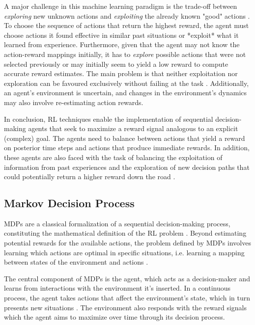A major challenge in this machine learning paradigm is the trade-off between \textit{exploring} new unknown actions and \textit{exploiting} the already known "good" actions \cite{suttonReinforcementLearningIntroduction2014}. To choose the sequence of actions that return the highest reward, the agent must choose actions it found effective in similar past situations or *exploit* what it learned from experience. Furthermore, given that the agent may not know the action-reward mappings initially, it has to \textit{explore} possible actions that were not selected previously or may initially seem to yield a low reward to compute accurate reward estimates. The main problem is that neither exploitation nor exploration can be favoured exclusively without failing at the task \cite{suttonReinforcementLearningIntroduction2014}. Additionally, an agent's environment is uncertain, and changes in the environment's dynamics may also involve re-estimating action rewards. \par


In conclusion, \ac{RL} techniques enable the implementation of sequential decision-making agents that seek to maximize a reward signal analogous to an explicit (complex) goal. The agents need to balance between actions that yield a reward on posterior time steps and actions that produce immediate rewards. In addition, these agents are also faced with the task of balancing the exploitation of information from past experiences and the exploration of new decision paths that could potentially return a higher reward down the road \cite{suttonReinforcementLearningIntroduction2014}.  \par



\subsection{Markov Decision Process} \label{section:mpd}
\acfp{MDP} are a classical formalization of a sequential decision-making process, constituting the mathematical definition of the \ac{RL} problem \cite{suttonReinforcementLearningIntroduction2014, moralesGrokkingDeepReinforcement2020}. Beyond estimating potential rewards for the available actions, the problem defined by \acp{MDP} involves learning which actions are optimal in specific situations, i.e. learning a mapping between states of the environment and actions \cite{suttonReinforcementLearningIntroduction2014}. 

The central component of \acp{MDP} is the agent, which acts as a decision-maker and learns from interactions with the environment it's inserted. In a continuous process, the agent takes actions that affect the environment's state, which in turn presents new situations \cite{suttonReinforcementLearningIntroduction2014}. The environment also responds with the reward signals which the agent aims to maximize over time through its decision process.

